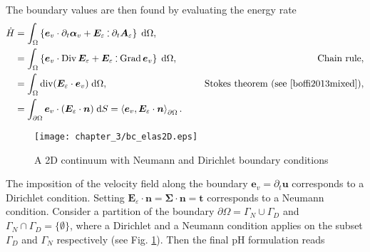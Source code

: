 The boundary values are then found by evaluating the energy rate
\begin{equation}\label{eq:enrateElas}
\begin{aligned}
\dot{H} &= \int_{\Omega} \left\{ \bm{e}_v \cdot \partial_t \bm\alpha_v + \bm{E}_\varepsilon \cddot \partial_t \bm{A}_\varepsilon \right\} \d\Omega, \\
&= \int_{\Omega} \left\{\bm{e}_v \cdot \Div \bm{E}_\varepsilon + \bm{E}_\varepsilon \cddot \Grad \bm{e}_v \right\}\d\Omega, \qquad &\text{Chain rule},\\
&= \int_{\Omega} \div(\bm{E}_\varepsilon \cdot \bm{e}_v) \d\Omega, \qquad &\text{Stokes theorem (see \cite[Chapter 1]{boffi2013mixed})}, \\
&= \int_{\partial \Omega} \bm{e}_v \cdot (\bm{E}_\varepsilon\cdot\bm{n}) \d{S} = \inner[\partial\Omega]{\bm{e}_v}{\bm{E}_\varepsilon \cdot\bm{n}}.
\end{aligned}
\end{equation}

\begin{figure}
\centering
\texttt{[image: chapter\_3/bc\_elas2D.eps]}
\caption{A 2D continuum with Neumann and Dirichlet boundary conditions}
\label{fig:bc_elas2D}
\end{figure}
The imposition of the velocity field along the boundary $\bm{e}_v = \partial_t \bm{u}$ corresponds to a Dirichlet condition. Setting $\bm{E}_\varepsilon \cdot\bm{n} = \bm{\Sigma} \cdot \bm{n} = \bm{t}$ corresponds to a Neumann condition. Consider a partition of the boundary $\partial\Omega = \Gamma_N \cup \Gamma_D$ and $\Gamma_N \cap \Gamma_D =  \{\emptyset\}$, where a Dirichlet and a Neumann condition applies on the subset $\Gamma_D$ and $\Gamma_N$ respectively (see Fig. \ref{fig:bc_elas2D}). Then the final pH formulation reads

